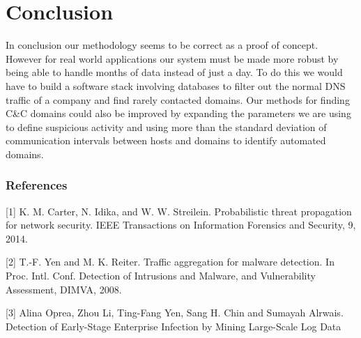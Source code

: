 \documentclass{article} %
\begin{document}
\section{Conclusion}
\label{conclusion}
In conclusion our methodology seems to be correct as a proof of concept. However for real world applications our system must be made more robust by being able to handle months of data instead of just a day. To do this we would have to build a software stack involving databases to filter out the normal DNS traffic of a company and find rarely contacted domains. Our methods for finding C\&C domains could also be improved by expanding the parameters we are using to define suspicious activity and using more than the standard deviation of communication intervals between hosts and domains to identify automated domains.


\subsubsection*{References}

\small{
[1] K. M. Carter, N. Idika, and W. W. Streilein. Probabilistic threat propagation for network security. IEEE Transactions on Information Forensics and Security, 9, 2014.

[2] T.-F. Yen and M. K. Reiter. Traffic aggregation for malware detection. In
Proc. Intl. Conf. Detection of Intrusions and Malware, and Vulnerability Assessment, DIMVA, 2008.

[3] Alina Oprea, Zhou Li, Ting-Fang Yen, Sang H. Chin and Sumayah Alrwais. Detection of Early-Stage Enterprise Infection by Mining Large-Scale Log Data
}
\end{document}
